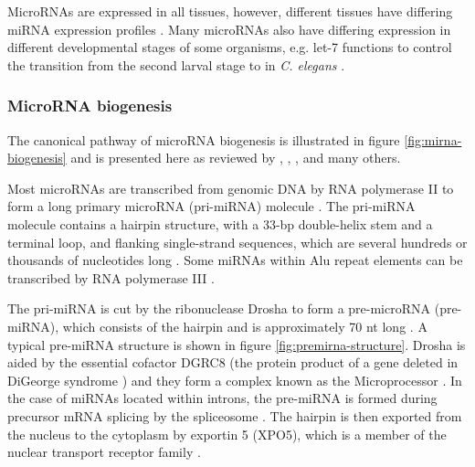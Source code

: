 MicroRNAs are expressed in all tissues, however, different tissues
have differing miRNA expression profiles \citep{Krol2010}. Many microRNAs also
have differing expression in different developmental stages
of some organisms, e.g. let-7 functions to control the transition
from the second larval stage to in \emph{C. elegans} \citep{Pasquelli2000}.







\subsubsection{MicroRNA biogenesis}\label{microrna-biogenesis}

The canonical pathway of microRNA biogenesis is illustrated in figure
\ref{fig:mirna-biogenesis} and is presented here as reviewed by \citet{Bartel2004},
\citet{Melo2011}, \citet{Ha2014}, and many others. 

Most microRNAs are transcribed from genomic DNA by RNA polymerase II to form a
long primary microRNA (pri-miRNA) molecule \citep{Lee2004}. The pri-miRNA molecule
contains a hairpin structure, with a 33-bp double-helix stem and a terminal
loop, and flanking single-strand sequences, which are several hundreds or
thousands of nucleotides long \citep{Kim2005}. Some miRNAs within Alu repeat elements
can be transcribed by RNA polymerase III \citep{Borchert2006}.

The pri-miRNA is cut by the ribonuclease Drosha to form%
a pre-microRNA (pre-miRNA), which consists of the hairpin and is
approximately 70 nt long \citep{Lee2003}. A typical pre-miRNA structure is
shown in figure \ref{fig:premirna-structure}. Drosha is aided by the essential
cofactor DGRC8 (the protein product of a gene deleted in DiGeorge syndrome \citep{Shiohama2003})
and they form a complex known as the Microprocessor \citep{Gregory2004}. In
the case of miRNAs located within introns, the pre-miRNA is formed during
precursor mRNA splicing by the spliceosome \citep{Ruby2007}. The hairpin is
then exported from the nucleus to the cytoplasm by exportin 5 (XPO5), which is
a member of the nuclear transport receptor family \citep{Lund2004}.


